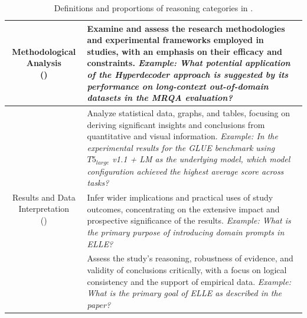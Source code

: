 \begin{table}[!t]
\begin{tabular}{cp{11.5cm}}
    \midrule
    \multirow{3}{*}{\parbox{4cm}{\centering Methodological Analysis \\ \centering()}}
    & Examine and assess the research methodologies and experimental frameworks employed in studies, with an emphasis on their efficacy and constraints. \emph{Example: What potential application of the Hyperdecoder approach is suggested by its performance on long-context out-of-domain datasets in the MRQA evaluation?} \\
    \midrule
    \multirow{3}{*}{\parbox{4cm}{\centering Results and Data Interpretation \\ \centering()}}
    & Analyze statistical data, graphs, and tables, focusing on deriving significant insights and conclusions from quantitative and visual information. \emph{Example: In the experimental results for the GLUE benchmark using $T5_{large}$ v1.1 + LM as the underlying model, which model configuration achieved the highest average score across tasks?} \\
    \midrule
    \multirow{3}{*}{\parbox{4cm}{\centering Implications and Inferences \\ \centering()}}
    & Infer wider implications and practical uses of study outcomes, concentrating on the extensive impact and prospective significance of the results. \emph{Example: What is the primary purpose of introducing domain prompts in ELLE?}\\
    \midrule
    \multirow{3}{*}{\parbox{4cm}{\centering Critical Analysis \\ \centering()}}
    & Assess the study’s reasoning, robustness of evidence, and validity of conclusions critically, with a focus on logical consistency and the support of empirical data. \emph{Example: What is the primary goal of ELLE as described in the paper?} \\
    \bottomrule
\end{tabular}
\caption{Definitions and proportions of reasoning categories in \data.}
\label{tab:reasoning definition}
\end{table}